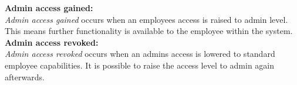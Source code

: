 \textbf{Admin access gained:}\\
\textit{Admin access gained} occurs when an employees access is raised to admin level. This means further functionality is available to the employee within the system.\\

\textbf{Admin access revoked:}\\
\textit{Admin access revoked} occurs when an admins access is lowered to standard employee capabilities. It is possible to raise the access level to admin again afterwards. \\




